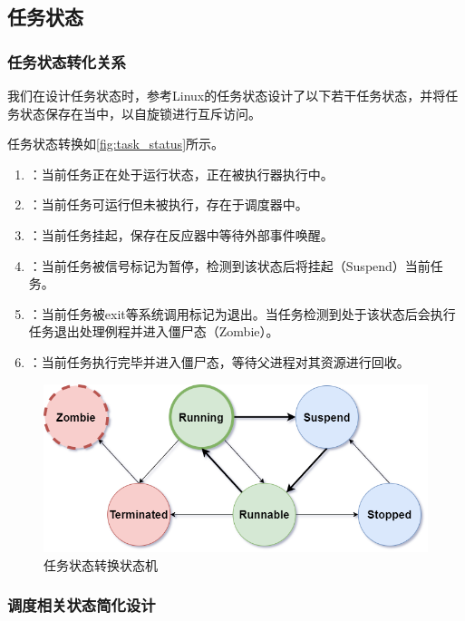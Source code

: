 \documentclass{article}
\begin{document}
\subsection{任务状态} \label{sec:task_status}

\subsubsection{任务状态转化关系}

我们在设计任务状态时，参考Linux的任务状态设计了以下若干任务状态，并将任务状态保存在当中，以自旋锁进行互斥访问。

任务状态转换如\autoref{fig:task_status}所示。

\begin{enumerate}
    \item {}：当前任务正在处于运行状态，正在被执行器执行中。
    \item {}：当前任务可运行但未被执行，存在于调度器中。
    \item {}：当前任务挂起，保存在反应器中等待外部事件唤醒。
    \item {}：当前任务被信号标记为暂停，检测到该状态后将挂起（Suspend）当前任务。
    \item {}：当前任务被exit等系统调用标记为退出。当任务检测到处于该状态后会执行任务退出处理例程并进入僵尸态（Zombie）。
    \item {}：当前任务执行完毕并进入僵尸态，等待父进程对其资源进行回收。
\end{enumerate}

\begin{figure}[H]
    \centering
    \includegraphics[width=0.7\linewidth]{assets/task/task_status.drawio.png}
    \caption{任务状态转换状态机}
    \label{fig:task_status}
\end{figure}

\subsubsection{调度相关状态简化设计}
\end{document}
